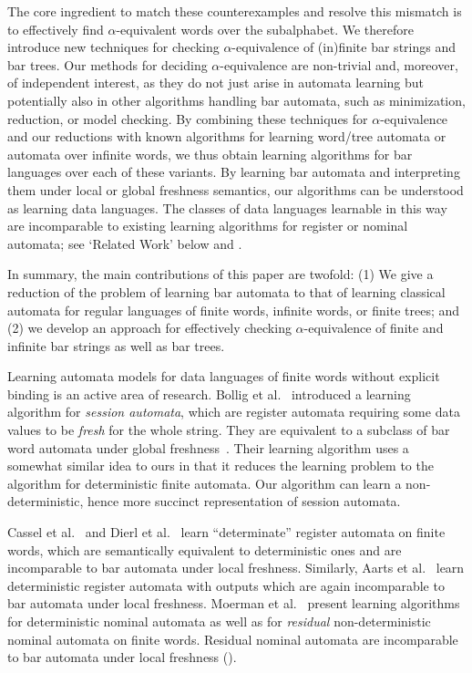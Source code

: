 \documentclass[a4paper,UKenglish,cleveref,autoref,thm-restate,numberwithinsect,final]{lipics-v2021}
\begin{document}
The core ingredient to match these counterexamples and resolve this mismatch is to effectively
find $\alpha$-equivalent words over the subalphabet. We therefore introduce new techniques for
checking $\alpha$-equivalence of (in)finite bar strings and bar trees.
Our
methods for deciding $\alpha$-equivalence are non-trivial and, moreover, of independent
interest, as they do not just arise in automata learning but potentially also in other
algorithms handling bar automata, such as minimization, reduction, or model checking.  By combining these
techniques for $\alpha$-equivalence and our reductions with known algorithms for learning
word/tree automata or automata over infinite words, we thus obtain learning algorithms for bar
languages over each of these variants. By learning bar automata and interpreting them under local or global freshness semantics, our algorithms can be understood as learning data languages. The classes of data languages learnable in this way are incomparable to existing learning algorithms for register or nominal automata; see `Related Work' below and . 

In summary, the main contributions of this paper are twofold:
(1) We give a reduction of the problem of learning bar automata to that of learning classical automata for regular languages of finite words, infinite words, or finite trees; and (2) we develop an approach for effectively
checking $\alpha$-equivalence of finite and infinite bar strings as well as bar trees.



    



 Learning automata models for data languages of finite words without explicit binding is an active area of research.
 Bollig et al.~\cite{BolligHLM13} introduced
a learning algorithm for \emph{session automata}, which are register automata requiring some
data values to be \emph{fresh} for the whole string. They are equivalent to a subclass of bar
word automata under global freshness~\cite{skmw17}.  Their learning
algorithm %
uses a somewhat similar idea to ours in that it reduces the learning problem to the \Lstar algorithm for deterministic
finite automata. Our algorithm can learn a non-deterministic, hence more succinct representation of session automata.

Cassel et al.~\cite{CasselHJS16} and Dierl et al.~\cite{DBLP:conf/tacas/DierlFHJST24} learn \enquote{determinate} register automata on finite words, which are semantically equivalent to deterministic ones and are incomparable to bar automata under local freshness.
Similarly, Aarts et al.~\cite{afkv15} learn deterministic register automata with outputs which are again incomparable to bar automata under local freshness.
Moerman et al.~\cite{mssks17,ms22} present learning algorithms for deterministic nominal automata as well as for \emph{residual} non-deterministic nominal automata on finite
words. Residual nominal automata are incomparable to bar automata under local freshness ().
\end{document}
